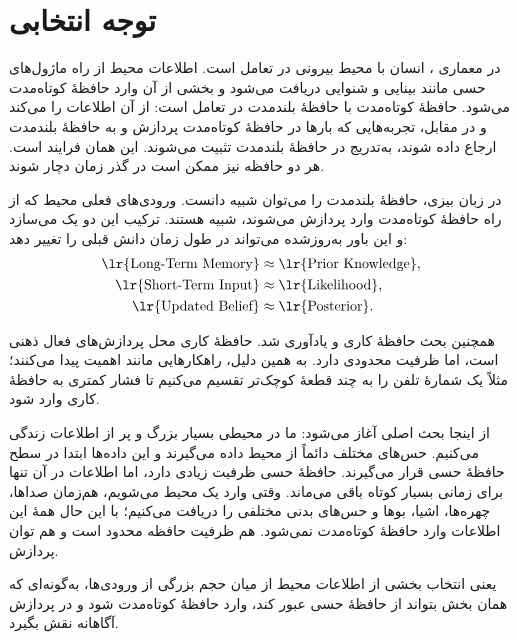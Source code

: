 
\section{توجه انتخابی}
در معماری ، انسان با محیط بیرونی در تعامل است. اطلاعات محیط از راه ماژول‌های حسی مانند بینایی و شنوایی دریافت می‌شود و بخشی از آن وارد حافظهٔ کوتاه‌مدت می‌شود. حافظهٔ کوتاه‌مدت با حافظهٔ بلندمدت در تعامل است: از آن اطلاعات را  می‌کند و در مقابل، تجربه‌هایی که بارها در حافظهٔ کوتاه‌مدت پردازش و به حافظهٔ بلندمدت ارجاع داده شوند، به‌تدریج در حافظهٔ بلندمدت تثبیت می‌شوند. این همان فرایند  است. هر دو حافظه نیز ممکن است در گذر زمان دچار  شوند.

در زبان بیزی، حافظهٔ بلندمدت را می‌توان شبیه  دانست. ورودی‌های فعلی محیط که از راه حافظهٔ کوتاه‌مدت وارد پردازش می‌شوند، شبیه  هستند. ترکیب این دو یک  می‌سازد و این باور به‌روزشده می‌تواند در طول زمان دانش قبلی را تغییر دهد:
\[
\begin{aligned}
\text{\lr{Long-Term Memory}} &\approx \text{\lr{Prior Knowledge}},\\
\text{\lr{Short-Term Input}} &\approx \text{\lr{Likelihood}},\\
\text{\lr{Updated Belief}} &\approx \text{\lr{Posterior}}.
\end{aligned}
\]

همچنین بحث حافظهٔ کاری و  یادآوری شد. حافظهٔ کاری محل پردازش‌های فعال ذهنی است، اما ظرفیت محدودی دارد. به همین دلیل، راهکارهایی مانند  اهمیت پیدا می‌کنند؛ مثلاً یک شمارهٔ تلفن را به چند قطعهٔ کوچک‌تر تقسیم می‌کنیم تا فشار کمتری به حافظهٔ کاری وارد شود.

از اینجا بحث اصلی آغاز می‌شود: ما در محیطی بسیار بزرگ و پر از اطلاعات زندگی می‌کنیم. حس‌های مختلف دائماً از محیط داده می‌گیرند و این داده‌ها ابتدا در سطح حافظهٔ حسی قرار می‌گیرند. حافظهٔ حسی ظرفیت زیادی دارد، اما اطلاعات در آن تنها برای زمانی بسیار کوتاه باقی می‌ماند. وقتی وارد یک محیط می‌شویم، هم‌زمان صداها، چهره‌ها، اشیا، بوها و حس‌های بدنی مختلفی را دریافت می‌کنیم؛ با این حال همهٔ این اطلاعات وارد حافظهٔ کوتاه‌مدت نمی‌شود. هم ظرفیت حافظه محدود است و هم توان پردازش.

 یعنی انتخاب بخشی از اطلاعات محیط از میان حجم بزرگی از ورودی‌ها، به‌گونه‌ای که همان بخش بتواند از حافظهٔ حسی عبور کند، وارد حافظهٔ کوتاه‌مدت شود و در پردازش آگاهانه نقش بگیرد.

